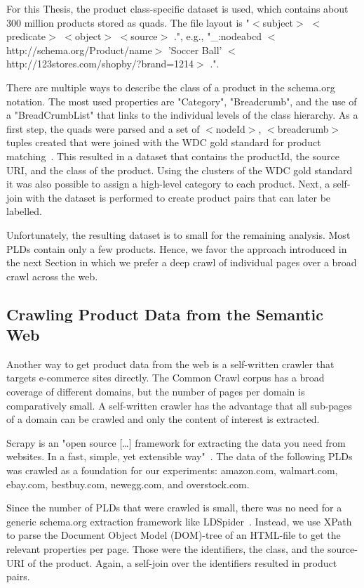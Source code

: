 For this Thesis, the product class-specific dataset is used, which contains about 300 million products stored as
quads.
The file layout is "$<$subject$>$ $<$predicate$>$ $<$object$>$ $<$source$>$ .", e.g.,
"\_:nodeabcd $<$http://schema.org/Product/name$>$ 'Soccer Ball' $<$http://123stores.com/shopby/?brand=1214$>$ .".

There are multiple ways to describe the class of a product in the schema.org notation.
The most used properties are "Category", "Breadcrumb", and the use of a "BreadCrumbList" that links to the individual
levels of the class hierarchy.
As a first step, the quads were parsed and a set of $<$nodeId$>$, $<$breadcrumb$>$ tuples created that were joined
with the WDC gold standard for product matching~\cite{petrovski2016wdc}.
This resulted in a dataset that contains the productId, the source URI, and the class of the product.
Using the clusters of the WDC gold standard it was also possible to assign a high-level category to each product.
Next, a self-join with the dataset is performed to create product pairs that can later be labelled.

Unfortunately, the resulting dataset is to small for the remaining analysis.
Most PLDs contain only a few products.
Hence, we favor the approach introduced in the next Section in which we prefer a deep crawl of individual pages
over a broad crawl across the web.

\subsection{Crawling Product Data from the Semantic Web}

Another way to get product data from the web is a self-written crawler that targets e-commerce sites directly.
The Common Crawl corpus has a broad coverage of different domains, but the number of pages per domain is
comparatively small.
A self-written crawler has the advantage that all sub-pages of a domain can be crawled and only the content of
interest is extracted.

Scrapy is an "open source [\ldots] framework for extracting the data you need from websites.
In a fast, simple, yet extensible way"~\cite{scrapy}.
The data of the following PLDs was crawled as a foundation for our experiments:
amazon.com, walmart.com, ebay.com, bestbuy.com, newegg.com, and overstock.com.

Since the number of PLDs that were crawled is small, there was no need for a generic schema.org extraction framework
like LDSpider~\cite{isele2010ldspider}.
Instead, we use XPath to parse the Document Object Model (DOM)-tree of an HTML-file to get
the relevant properties per page.
Those were the identifiers, the class, and the source-URI of the product.
Again, a self-join over the identifiers resulted in product pairs.


